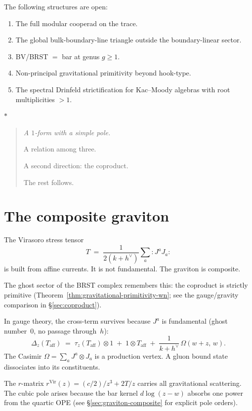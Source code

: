 \documentclass[11pt]{article}
\newcommand{\normord}[1]{:\!#1\!:}
\newcommand{\sep}{\bigskip\begin{center}$*$\end{center}\medskip}
\begin{document}
The following structures are open:
\begin{enumerate}[nosep]
\item The full modular cooperad on the trace.
\item The global bulk-boundary-line triangle outside the
  boundary-linear sector.
\item BV/BRST $=$ bar at genus $g \geq 1$.
\item Non-principal gravitational primitivity beyond hook-type.
\item The spectral Drinfeld strictification for Kac--Moody
  algebras with root multiplicities $> 1$.
\end{enumerate}

\sep

\begin{quote}\itshape
A $1$-form with a simple pole.

A relation among three.

A second direction: the coproduct.

The rest follows.
\end{quote}


\section{The composite graviton}
\label{sec:composite-graviton}

The Virasoro stress tensor
\[
T \;=\; \frac{1}{2(k+h^\vee)}\sum_a \normord{J^a J_a}
\]
is built from affine currents.  It is not fundamental.  The
graviton is composite.

The ghost sector of the BRST complex remembers this: the
coproduct is strictly primitive
(Theorem~\ref{thm:gravitational-primitivity-wn}; see the
gauge/gravity comparison in \S\ref{sec:coproduct}).

In gauge theory, the cross-term survives because $J^a$ is
fundamental (ghost number~$0$, no passage through~$h$):
\[
\Delta_z(T_{\mathrm{aff}}) \;=\;
\tau_z(T_{\mathrm{aff}}) \otimes 1
\;+\; 1 \otimes T_{\mathrm{aff}}
\;+\; \frac{1}{k+h^\vee}\,\Omega(w{+}z,\, w).
\]
The Casimir $\Omega = \sum_a J^a \otimes J_a$ is a production
vertex.  A gluon bound state dissociates into its constituents.

The $r$-matrix $r^{\mathrm{Vir}}(z) = (c/2)/z^3 + 2T/z$ carries
all gravitational scattering.  The cubic pole arises because
the bar kernel $d\log(z-w)$ absorbs one power from the quartic
OPE (see \S\ref{sec:graviton-composite} for explicit pole orders).
\end{document}
